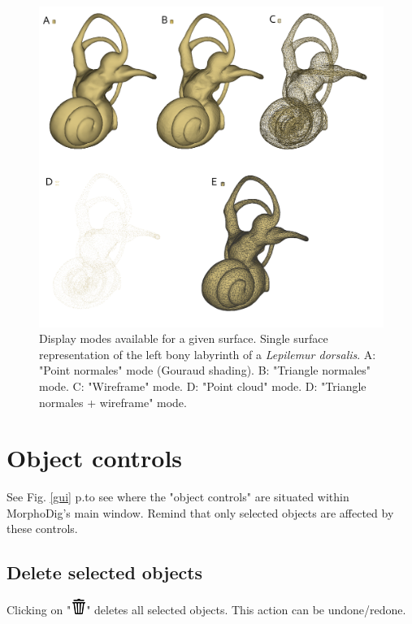 \begin{figure}
  \centering
  \includegraphics[scale=0.25]{images/06/display/5display_modes.png} 
	\caption{Display modes available for a given surface. Single surface representation of the left bony labyrinth of a  \textit{Lepilemur dorsalis}. A: "Point normales" mode (Gouraud shading). B: "Triangle normales" mode. C: "Wireframe" mode. D: "Point cloud" mode. D: "Triangle normales + wireframe" mode.}
\label{5display_modes}
 
\end{figure}





  \section{Object controls}
See Fig. \ref{gui} p.\pageref{gui}to see where the "object controls" are situated within MorphoDig's main window. Remind that only selected objects are affected by these controls.

\subsection{Delete selected objects}
Clicking on "\includegraphics[scale=0.7]{images/06/objects/delete2.png}" deletes all selected objects. This action can be undone/redone.

